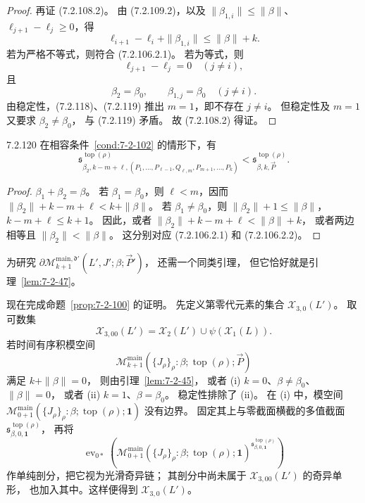 \begin{proof}
再证 (7.2.108.2)。
由 (7.2.109.2)，以及
$\|\beta_{1,i}\|\le\|\beta\|$、
$\ell_{j+1}-\ell_j\ge0$，得
\begin{equation}
\ell_{i+1}-\ell_i+\|\beta_{1,i}\|
\le\|\beta\|+k.
\tag{7.2.117}\label{eq:7-2-117}
\end{equation}
若为严格不等式，则符合 (7.2.106.2.1)。
若为等式，则
\begin{equation}
\ell_{j+1}-\ell_j=0\quad(j\ne i),
\tag{7.2.118}\label{eq:7-2-118}
\end{equation}
且
\begin{equation}
\beta_2=\beta_0,
\qquad\beta_{1,j}=\beta_0\quad(j\ne i).
\tag{7.2.119}\label{eq:7-2-119}
\end{equation}
由稳定性，(7.2.118)、(7.2.119)
推出 $m=1$，即不存在 $j\ne i$。
但稳定性及 $m=1$ 又要求
$\beta_2\ne\beta_0$，
与 (7.2.119) 矛盾。
故 (7.2.108.2) 得证。
\end{proof}

\begin{lemma}{7.2.120}\label{lem:7-2-120}
在相容条件~\ref{cond:7-2-102} 的情形下，有
\[
\mathfrak s^{\operatorname{top}(\rho)}_{
\beta_2,k-m+\ell,
(P_1,\ldots,P_{\ell-1},Q_{\ell,m},P_{m+1},\ldots,P_k)}
<\mathfrak s^{\operatorname{top}(\rho)}_{\beta,k,\vec P}.
\]
\end{lemma}
\begin{proof}
$\beta_1+\beta_2=\beta$。
若 $\beta_1=\beta_0$，则 $\ell<m$，因而
$\|\beta_2\|+k-m+\ell<k+\|\beta\|$。
若 $\beta_1\ne\beta_0$，则
$\|\beta_2\|+1\le\|\beta\|$，
$k-m+\ell\le k+1$。
因此，或者
$\|\beta_2\|+k-m+\ell<\|\beta\|+k$，
或者两边相等且
$\|\beta_2\|<\|\beta\|$。
这分别对应 (7.2.106.2.1) 和 (7.2.106.2.2)。
\end{proof}

为研究
$\partial\mathcal M^{\mathrm{main},\mathfrak d'}_{k+1}
(L',J';\beta;\vec P')$，
还需一个同类引理，
但它恰好就是引理~\ref{lem:7-2-47}。

现在完成命题~\ref{prop:7-2-100} 的证明。
先定义第零代元素的集合
$\mathcal X_{3,0}(L')$。
取可数集
\[
\mathcal X_{3,00}(L')
=\mathcal X_2(L')\cup\psi(\mathcal X_1(L)).
\]
若时间有序积模空间
\[
\mathcal M^{\mathrm{main}}_{k+1}
(\{J_\rho\}_\rho:\beta;
\operatorname{top}(\rho);\vec P)
\]
满足 $k+\|\beta\|=0$，
则由引理~\ref{lem:7-2-45}，
或者 (i) $k=0$、$\beta\ne\beta_0$、
$\|\beta\|=0$，
或者 (ii) $k=1$、$\beta=\beta_0$。
稳定性排除了 (ii)。
在 (i) 中，模空间
$\mathcal M^{\mathrm{main}}_{0+1}
(\{J_\rho\}_\rho:\beta;
\operatorname{top}(\rho);\mathbf 1)$
没有边界。
固定其上与零截面横截的多值截面
$\mathfrak s^{\operatorname{top}(\rho)}_{\beta,0,\mathbf 1}$，
再将
\[
\operatorname{ev}_{0*}\left(
\mathcal M^{\mathrm{main}}_{0+1}
(\{J_\rho\}_\rho:\beta;
\operatorname{top}(\rho);\mathbf 1)
^{\mathfrak s^{\operatorname{top}(\rho)}_{\beta,0,\mathbf 1}}
\right)
\]
作单纯剖分，把它视为光滑奇异链；
其剖分中尚未属于
$\mathcal X_{3,00}(L')$ 的奇异单形，
也加入其中。这样便得到
$\mathcal X_{3,0}(L')$。

